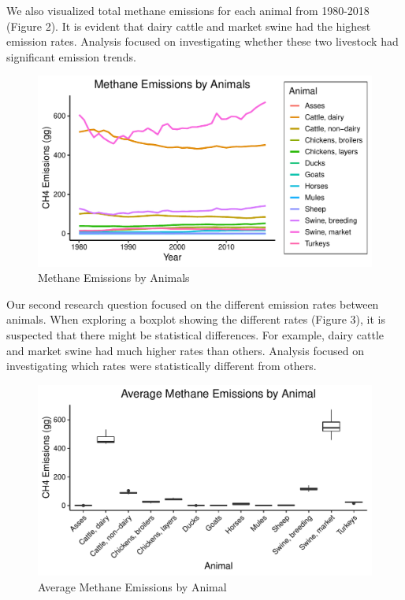 \documentclass[
  12pt,
]{article}
\begin{document}
We also visualized total methane emissions for each animal from
1980-2018 (Figure 2). It is evident that dairy cattle and market swine
had the highest emission rates. Analysis focused on investigating
whether these two livestock had significant emission trends.

\begin{figure}
\centering
\includegraphics{SultzerSwit_ENV872_Project_files/figure-latex/unnamed-chunk-3-1.pdf}
\caption{Methane Emissions by Animals}
\end{figure}

Our second research question focused on the different emission rates
between animals. When exploring a boxplot showing the different rates
(Figure 3), it is suspected that there might be statistical differences.
For example, dairy cattle and market swine had much higher rates than
others. Analysis focused on investigating which rates were statistically
different from others.

\begin{figure}
\centering
\includegraphics{SultzerSwit_ENV872_Project_files/figure-latex/viewing boxplot of methane by animal-1.pdf}
\caption{Average Methane Emissions by Animal}
\end{figure}
\end{document}
